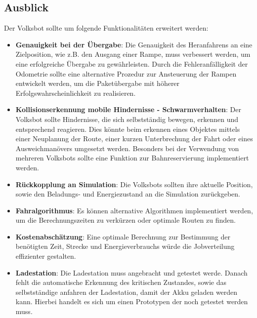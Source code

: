 \subsection{Ausblick}

Der Volksbot sollte um folgende Funktionalitäten erweitert werden:

\begin{itemize}

\item \textbf{Genauigkeit bei der Übergabe}: Die Genauigkeit des Heranfahrens an eine Zielposition, wie z.B. den Ausgang einer Rampe, muss verbessert werden, um eine erfolgreiche Übergabe zu gewährleisten. Durch die Fehleranfälligkeit der Odometrie sollte eine alternative Prozedur zur Ansteuerung der Rampen entwickelt werden, um die Paketübergabe mit höherer Erfolgswahrscheinlichkeit zu realisieren.

\item \textbf{Kollisionserkennung mobile Hindernisse - Schwarmverhalten}: Der Volksbot sollte Hindernisse, die sich selbstständig bewegen, erkennen und entsprechend reagieren. Dies könnte beim erkennen eines Objektes mittels einer Neuplanung der Route, einer kurzen Unterbrechung der Fahrt oder eines Ausweichmanövers umgesetzt werden. Besonders bei der Verwendung von mehreren Volksbots sollte eine Funktion zur Bahnreservierung implementiert werden. 

\item \textbf{Rückkopplung an Simulation}: Die Volksbots sollten ihre aktuelle Position, sowie den Beladungs- und Energiezustand an die Simulation zurückgeben.

\item \textbf{Fahralgorithmus}: Es können alternative Algorithmen implementiert werden, um die Berechnungszeiten zu verkürzen oder optimale Routen zu finden.

\item \textbf{Kostenabschätzung}: Eine optimale Berechnung zur Bestimmung der benötigten Zeit, Strecke und Energieverbrauchs würde die Jobverteilung effizienter gestalten.

\item \textbf{Ladestation}: Die Ladestation muss angebracht und getestet werde. Danach fehlt die automatische Erkennung des kritischen Zustandes, sowie das selbstständige anfahren der Ladestation, damit der Akku geladen werden kann. Hierbei handelt es sich um einen Prototypen der noch getestet werden muss.

\end{itemize}
